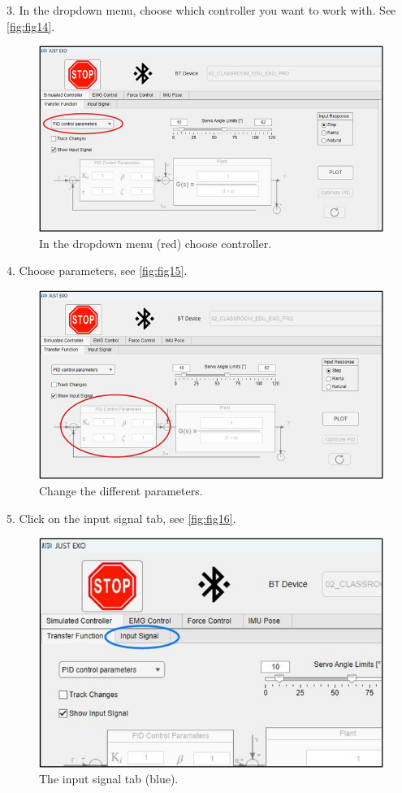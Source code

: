 3.	In the dropdown menu, choose which controller you want to work with. See \autoref{fig:fig14}.
\begin{figure}[H]
	\centering
	\includegraphics[width=0.7\linewidth]{img/fig_14}
	\caption{In the dropdown menu (red) choose controller.}
	\label{fig:fig14}
\end{figure}

4.	Choose parameters, see \autoref{fig:fig15}.
\begin{figure}[H]
	\centering
	\includegraphics[width=0.7\linewidth]{img/fig_15}
	\caption{Change the different parameters.}
	\label{fig:fig15}
\end{figure}

5.	Click on the input signal tab, see \autoref{fig:fig16}.

\begin{figure}[H]
	\centering
	\includegraphics[width=0.7\linewidth]{img/fig_16}
	\caption{The input signal tab (blue).}
	\label{fig:fig16}
\end{figure}


